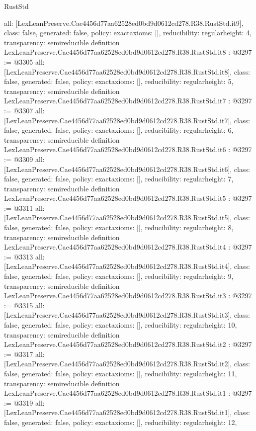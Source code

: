 \begin{lexlean}{RustStd}
\begin{coremodule}
{  all: [LexLeanPreserve.Cae4456d77aa62528ed0bd9d0612cd278.R38.RustStd.it9],
  class: false,
  generated: false,
  policy: exact{axioms: []},
  reducibility: regular{height: 4},
  transparency: semireducible
}
definition LexLeanPreserve.Cae4456d77aa62528ed0bd9d0612cd278.R38.RustStd.it8 : @3297 := @3305 {
  all: [LexLeanPreserve.Cae4456d77aa62528ed0bd9d0612cd278.R38.RustStd.it8],
  class: false,
  generated: false,
  policy: exact{axioms: []},
  reducibility: regular{height: 5},
  transparency: semireducible
}
definition LexLeanPreserve.Cae4456d77aa62528ed0bd9d0612cd278.R38.RustStd.it7 : @3297 := @3307 {
  all: [LexLeanPreserve.Cae4456d77aa62528ed0bd9d0612cd278.R38.RustStd.it7],
  class: false,
  generated: false,
  policy: exact{axioms: []},
  reducibility: regular{height: 6},
  transparency: semireducible
}
definition LexLeanPreserve.Cae4456d77aa62528ed0bd9d0612cd278.R38.RustStd.it6 : @3297 := @3309 {
  all: [LexLeanPreserve.Cae4456d77aa62528ed0bd9d0612cd278.R38.RustStd.it6],
  class: false,
  generated: false,
  policy: exact{axioms: []},
  reducibility: regular{height: 7},
  transparency: semireducible
}
definition LexLeanPreserve.Cae4456d77aa62528ed0bd9d0612cd278.R38.RustStd.it5 : @3297 := @3311 {
  all: [LexLeanPreserve.Cae4456d77aa62528ed0bd9d0612cd278.R38.RustStd.it5],
  class: false,
  generated: false,
  policy: exact{axioms: []},
  reducibility: regular{height: 8},
  transparency: semireducible
}
definition LexLeanPreserve.Cae4456d77aa62528ed0bd9d0612cd278.R38.RustStd.it4 : @3297 := @3313 {
  all: [LexLeanPreserve.Cae4456d77aa62528ed0bd9d0612cd278.R38.RustStd.it4],
  class: false,
  generated: false,
  policy: exact{axioms: []},
  reducibility: regular{height: 9},
  transparency: semireducible
}
definition LexLeanPreserve.Cae4456d77aa62528ed0bd9d0612cd278.R38.RustStd.it3 : @3297 := @3315 {
  all: [LexLeanPreserve.Cae4456d77aa62528ed0bd9d0612cd278.R38.RustStd.it3],
  class: false,
  generated: false,
  policy: exact{axioms: []},
  reducibility: regular{height: 10},
  transparency: semireducible
}
definition LexLeanPreserve.Cae4456d77aa62528ed0bd9d0612cd278.R38.RustStd.it2 : @3297 := @3317 {
  all: [LexLeanPreserve.Cae4456d77aa62528ed0bd9d0612cd278.R38.RustStd.it2],
  class: false,
  generated: false,
  policy: exact{axioms: []},
  reducibility: regular{height: 11},
  transparency: semireducible
}
definition LexLeanPreserve.Cae4456d77aa62528ed0bd9d0612cd278.R38.RustStd.it1 : @3297 := @3319 {
  all: [LexLeanPreserve.Cae4456d77aa62528ed0bd9d0612cd278.R38.RustStd.it1],
  class: false,
  generated: false,
  policy: exact{axioms: []},
  reducibility: regular{height: 12},
}
\end{coremodule}
\end{lexlean}
